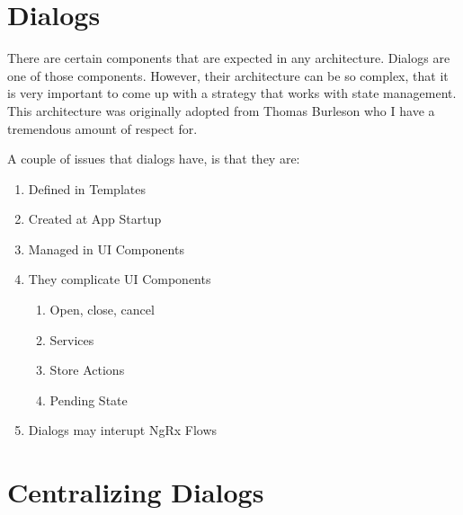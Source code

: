 \maketitle{}
\section{ Dialogs }

There are certain components that are expected in any architecture. Dialogs are
one of those components. However, their architecture can be so complex, that it
is very important to come up with a strategy that works with state management.
This architecture was originally adopted from Thomas Burleson who I have a
tremendous amount of respect for.

A couple of issues that dialogs have, is that they are:
\begin{enumerate}
  \item Defined in Templates
  \item Created at App Startup
  \item Managed in UI Components
  \item They complicate UI Components
    \begin{enumerate}
      \item Open, close, cancel
      \item Services
      \item Store Actions
      \item Pending State
    \end{enumerate}
  \item Dialogs may interupt NgRx Flows
\end{enumerate}

\section{ Centralizing Dialogs }
